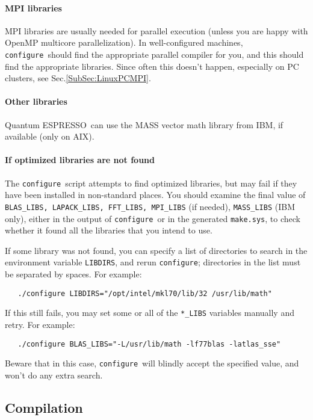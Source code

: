 \documentclass[12pt,a4paper]{article}
\def\qe{{\sc Quantum ESPRESSO}}
\def\configure{\texttt{configure}}
\begin{document}
\paragraph{MPI libraries} 
MPI libraries are usually needed for parallel execution 
(unless you are happy with OpenMP multicore parallelization).
In well-configured machines, \configure\ should find the appropriate
parallel compiler for you, and this should find the appropriate
libraries. Since often this doesn't 
happen, especially on PC clusters, see Sec.\ref{SubSec:LinuxPCMPI}.

\paragraph{Other libraries}
\qe\ can use the MASS vector math
library from IBM, if available (only on AIX).

\paragraph{If optimized libraries are not found}
The \configure\ script attempts to find optimized libraries, but may fail
if they have been installed in non-standard places. You should examine
the final value of \texttt{BLAS\_LIBS, LAPACK\_LIBS, FFT\_LIBS, MPI\_LIBS} (if needed),
\texttt{MASS\_LIBS} (IBM only), either in the output of \configure\ or in the generated
\texttt{make.sys}, to check whether it found all the libraries that you intend to use.
    
If some library was not found, you can specify a list of directories to search
in the environment variable \texttt{LIBDIRS}, 
and rerun \configure; directories in the
list must be separated by spaces. For example:
\begin{verbatim}
   ./configure LIBDIRS="/opt/intel/mkl70/lib/32 /usr/lib/math"
\end{verbatim}
If this still fails, you may set some or all of the \texttt{*\_LIBS} variables manually
and retry. For example:
\begin{verbatim}
   ./configure BLAS_LIBS="-L/usr/lib/math -lf77blas -latlas_sse"
\end{verbatim}
Beware that in this case, \configure\ will blindly accept the specified value,
and won't do any extra search. 
    
\subsection{Compilation}
\end{document}
